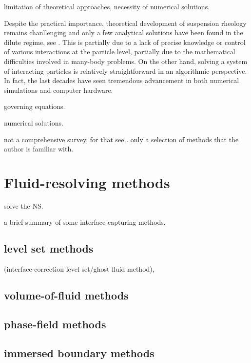 limitation of theoretical approaches,
necessity of numerical solutions.

Despite the practical importance, theoretical development of suspension rheology remains chanllenging and only a few analytical solutions have been found in the dilute regime, see \eg \cite{Einstein_1906, batchelor_green_1972b}. This is partially due to a lack of precise knowledge or control of various interactions at the particle level, partially due to the mathematical difficulties involved in many-body problems. On the other hand, solving a system of interacting particles is relatively straightforward in an algorithmic perspective. In fact, the last decades have seen tremendous advancement in both numerical simulations and computer hardware.

governing equations.

numerical solutions.

not a comprehensive survey, for that see \cite{prosp_trigg}.
only a selection of methods that the author is familiar with.



\section{Fluid-resolving methods}
\label{sec:fluid-methods}

solve the NS.

a brief summary of some interface-capturing methods.

\subsection{level set methods}
(interface-correction level set/ghost fluid method),

\subsection{volume-of-fluid methods}

\subsection{phase-field methods}

\subsection{immersed boundary methods}

